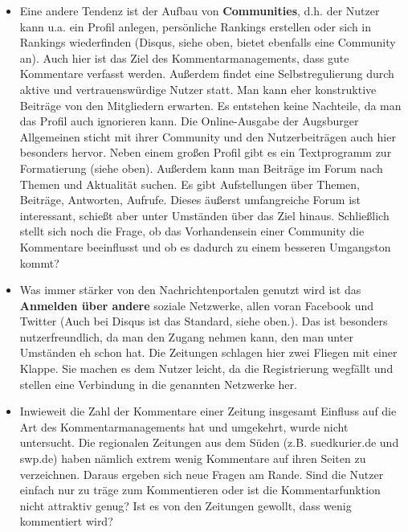 \begin{itemize}
\item Eine andere Tendenz ist der Aufbau von {\bfseries Communities}, d.h. der Nutzer kann u.a. ein Profil anlegen, persönliche Rankings erstellen oder sich in Rankings wiederfinden (Disqus, siehe oben,  bietet ebenfalls eine Community an). Auch hier ist das Ziel des Kommentarmanagements, dass gute Kommentare verfasst werden. Außerdem findet eine Selbstregulierung durch aktive und vertrauenswürdige Nutzer statt. Man kann eher konstruktive Beiträge von den Mitgliedern erwarten. Es entstehen keine Nachteile, da man das Profil auch ignorieren kann.
Die Online-Ausgabe der Augsburger Allgemeinen sticht mit ihrer Community und den Nutzerbeiträgen auch hier besonders hervor. Neben einem großen Profil gibt es ein Textprogramm zur Formatierung (siehe oben). Außerdem kann man Beiträge im Forum nach Themen und Aktualität suchen. Es gibt Aufstellungen über Themen, Beiträge, Antworten, Aufrufe. Dieses äußerst umfangreiche Forum ist interessant, schießt aber unter Umständen über das Ziel hinaus. 
Schließlich stellt sich noch die Frage, ob das Vorhandensein einer Community die Kommentare beeinflusst und ob es dadurch zu einem besseren Umgangston kommt?\\

\item Was immer stärker von den Nachrichtenportalen genutzt wird ist das
{\bfseries Anmelden über andere} soziale Netzwerke, allen voran Facebook und Twitter (Auch bei Disqus ist das Standard, siehe oben.). Das ist besonders nutzerfreundlich, da man den Zugang nehmen kann, den man unter Umständen eh schon hat. Die Zeitungen schlagen hier zwei Fliegen mit einer Klappe. Sie machen es dem Nutzer leicht, da die Registrierung wegfällt und stellen eine Verbindung in die genannten Netzwerke her. 

\item Inwieweit die Zahl der Kommentare einer Zeitung insgesamt Einfluss auf die Art des Kommentarmanagements hat und umgekehrt, wurde nicht
untersucht. Die regionalen Zeitungen aus dem Süden (z.B. suedkurier.de und swp.de) haben nämlich extrem wenig Kommentare auf ihren Seiten zu verzeichnen. 
Daraus ergeben sich neue Fragen am Rande. Sind die Nutzer einfach nur zu träge zum Kommentieren oder
ist die Kommentarfunktion nicht attraktiv genug? Ist es von den Zeitungen gewollt, dass wenig kommentiert wird? 

\end{itemize}




